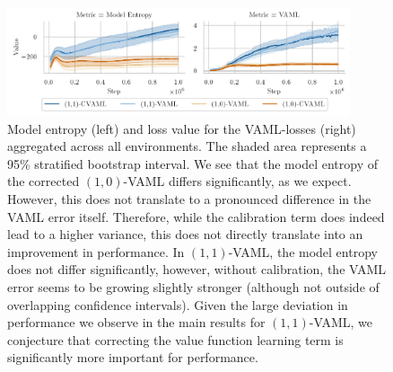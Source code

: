 \begin{figure}[h]
    \centering
    \includegraphics[width=0.9\textwidth]{figures/lambda/plts/app_metrics.pdf} 
    \caption{Model entropy (left) and loss value for the VAML-losses (right) aggregated across all environments. The shaded area represents a 95\% stratified bootstrap interval. We see that the model entropy of the corrected $(1,0)$-VAML differs significantly, as we expect. However, this does not translate to a pronounced difference in the VAML error itself. Therefore, while the calibration term does indeed lead to a higher variance, this does not directly translate into an improvement in performance. In $(1,1)$-VAML, the model entropy does not differ significantly, however, without calibration, the VAML error seems to be growing slightly stronger (although not outside of overlapping confidence intervals). Given the large deviation in performance we observe in the main results for $(1,1)$-VAML, we conjecture that correcting the value function learning term is significantly more important for performance.}
   \label{fig:vaml_entropy}
\end{figure}
